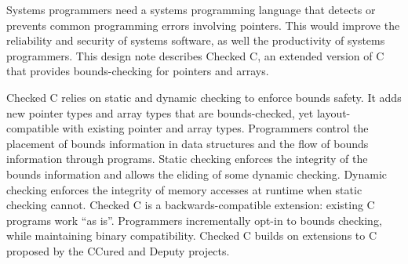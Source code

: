 
\parbox{5in}{
Systems programmers need a systems programming language that
detects or prevents common programming errors involving pointers. This
would improve the reliability and security of systems software, as well
the productivity of systems programmers. This design note describes
Checked C, an extended version of C that provides bounds-checking for
pointers and arrays.
}

\parbox{5in}{
Checked C relies on static and dynamic checking to enforce bounds
safety. It adds new pointer types and array types that are
bounds-checked, yet layout-compatible with existing pointer and array
types. Programmers control the placement of bounds information in data
structures and the flow of bounds information through programs. Static
checking enforces the integrity of the bounds information and allows the
eliding of some dynamic checking. Dynamic checking enforces the
integrity of memory accesses at runtime when static checking cannot.
Checked C is a backwards-compatible extension: existing C programs work
``as is''. Programmers incrementally opt-in to bounds checking, while
maintaining binary compatibility. Checked C builds on extensions to C
proposed by the CCured and Deputy projects.
}


